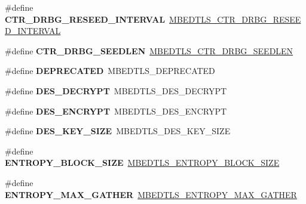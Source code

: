 \begin{DoxyCompactItemize}
\item 
\mbox{\label{compat-1_83_8h_aada2905e3923ac30ff08869396fa715a}} 
\#define {\bfseries C\+T\+R\+\_\+\+D\+R\+B\+G\+\_\+\+R\+E\+S\+E\+E\+D\+\_\+\+I\+N\+T\+E\+R\+V\+AL}~\mbox{\hyperlink{ctr__drbg_8h_af48f34760ba188dfc8e851c66e891c19}{M\+B\+E\+D\+T\+L\+S\+\_\+\+C\+T\+R\+\_\+\+D\+R\+B\+G\+\_\+\+R\+E\+S\+E\+E\+D\+\_\+\+I\+N\+T\+E\+R\+V\+AL}}
\item 
\mbox{\label{compat-1_83_8h_ab2109628bba8f8548bf5f0d18bf18cd8}} 
\#define {\bfseries C\+T\+R\+\_\+\+D\+R\+B\+G\+\_\+\+S\+E\+E\+D\+L\+EN}~\mbox{\hyperlink{ctr__drbg_8h_a8e6ac8e75c3becda32d9bc7b8ac2c23a}{M\+B\+E\+D\+T\+L\+S\+\_\+\+C\+T\+R\+\_\+\+D\+R\+B\+G\+\_\+\+S\+E\+E\+D\+L\+EN}}
\item 
\mbox{\label{compat-1_83_8h_ac1e8a42306d8e67cb94ca31c3956ee78}} 
\#define {\bfseries D\+E\+P\+R\+E\+C\+A\+T\+ED}~M\+B\+E\+D\+T\+L\+S\+\_\+\+D\+E\+P\+R\+E\+C\+A\+T\+ED
\item 
\mbox{\label{compat-1_83_8h_a7ca3b464dc9e6cabf82f636101b6e133}} 
\#define {\bfseries D\+E\+S\+\_\+\+D\+E\+C\+R\+Y\+PT}~M\+B\+E\+D\+T\+L\+S\+\_\+\+D\+E\+S\+\_\+\+D\+E\+C\+R\+Y\+PT
\item 
\mbox{\label{compat-1_83_8h_a89730e026cc6082480f070985e91e8aa}} 
\#define {\bfseries D\+E\+S\+\_\+\+E\+N\+C\+R\+Y\+PT}~M\+B\+E\+D\+T\+L\+S\+\_\+\+D\+E\+S\+\_\+\+E\+N\+C\+R\+Y\+PT
\item 
\mbox{\label{compat-1_83_8h_a8bf6267292365ce38e20d505445a361b}} 
\#define {\bfseries D\+E\+S\+\_\+\+K\+E\+Y\+\_\+\+S\+I\+ZE}~M\+B\+E\+D\+T\+L\+S\+\_\+\+D\+E\+S\+\_\+\+K\+E\+Y\+\_\+\+S\+I\+ZE
\item 
\mbox{\label{compat-1_83_8h_a4610ce6582323b8906b9e05ae6253dfb}} 
\#define {\bfseries E\+N\+T\+R\+O\+P\+Y\+\_\+\+B\+L\+O\+C\+K\+\_\+\+S\+I\+ZE}~\mbox{\hyperlink{entropy_8h_acc0fdb8c34a1ae04a81b4b21cb383941}{M\+B\+E\+D\+T\+L\+S\+\_\+\+E\+N\+T\+R\+O\+P\+Y\+\_\+\+B\+L\+O\+C\+K\+\_\+\+S\+I\+ZE}}
\item 
\mbox{\label{compat-1_83_8h_acc7f201066c056a514433c5a6224b720}} 
\#define {\bfseries E\+N\+T\+R\+O\+P\+Y\+\_\+\+M\+A\+X\+\_\+\+G\+A\+T\+H\+ER}~\mbox{\hyperlink{entropy_8h_a21637aa9a738da4fce13931a8442dc28}{M\+B\+E\+D\+T\+L\+S\+\_\+\+E\+N\+T\+R\+O\+P\+Y\+\_\+\+M\+A\+X\+\_\+\+G\+A\+T\+H\+ER}}

\end{DoxyCompactItemize}
